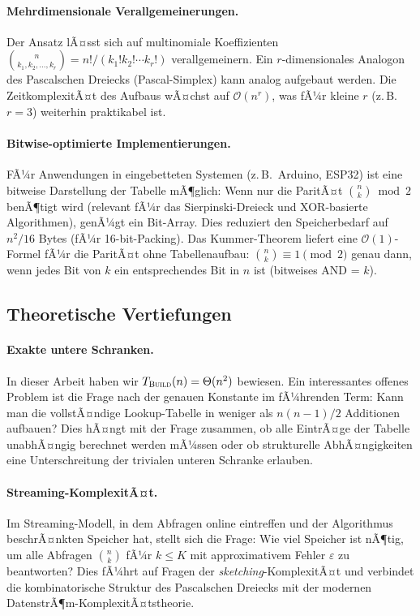 ﻿\documentclass[12pt, a4paper]{article}
\newcommand{\Oh}{\mathcal{O}}
\newcommand{\build}{\textsc{Build}}
\theoremstyle{plain}
\theoremstyle{definition}
\theoremstyle{remark}
\renewcommand{\Oh}{\mathcal{O}}
\renewcommand{\build}{\textsc{Build}}
\begin{document}
\paragraph{Mehrdimensionale Verallgemeinerungen.}
Der Ansatz lÃ¤sst sich auf multinomiale Koeffizienten
$\binom{n}{k_1, k_2, \ldots, k_r} = n! / (k_1! k_2! \cdots k_r!)$
verallgemeinern. Ein $r$-dimensionales Analogon des Pascalschen
Dreiecks (Pascal-Simplex) kann analog aufgebaut werden. Die
ZeitkomplexitÃ¤t des Aufbaus wÃ¤chst auf $\Oh(n^r)$, was fÃ¼r kleine
$r$ (z.\,B.\ $r = 3$) weiterhin praktikabel ist.

\paragraph{Bitwise-optimierte Implementierungen.}
FÃ¼r Anwendungen in eingebetteten Systemen (z.\,B.\ Arduino, ESP32)
ist eine bitweise Darstellung der Tabelle mÃ¶glich: Wenn nur die
ParitÃ¤t $\binom{n}{k} \bmod 2$ benÃ¶tigt wird (relevant fÃ¼r das
Sierpinski-Dreieck und XOR-basierte Algorithmen), genÃ¼gt ein
Bit-Array. Dies reduziert den Speicherbedarf auf $n^2/16$ Bytes
(fÃ¼r 16-bit-Packing). Das Kummer-Theorem liefert eine
$\Oh(1)$-Formel fÃ¼r die ParitÃ¤t ohne Tabellenaufbau:
$\binom{n}{k} \equiv 1 \pmod{2}$ genau dann, wenn jedes Bit von $k$
ein entsprechendes Bit in $n$ ist (bitweises AND = $k$).

\subsection{Theoretische Vertiefungen}

\paragraph{Exakte untere Schranken.}
In dieser Arbeit haben wir $T_{\build}(n) = \Theta(n^2)$ bewiesen.
Ein interessantes offenes Problem ist die Frage nach der genauen
Konstante im fÃ¼hrenden Term: Kann man die vollstÃ¤ndige Lookup-Tabelle
in weniger als $n(n-1)/2$ Additionen aufbauen? Dies hÃ¤ngt mit der
Frage zusammen, ob alle EintrÃ¤ge der Tabelle unabhÃ¤ngig berechnet
werden mÃ¼ssen oder ob strukturelle AbhÃ¤ngigkeiten eine Unterschreitung
der trivialen unteren Schranke erlauben.

\paragraph{Streaming-KomplexitÃ¤t.}
Im Streaming-Modell, in dem Abfragen online eintreffen und der
Algorithmus beschrÃ¤nkten Speicher hat, stellt sich die Frage:
Wie viel Speicher ist nÃ¶tig, um alle Abfragen $\binom{n}{k}$ fÃ¼r
$k \le K$ mit approximativem Fehler $\varepsilon$ zu beantworten?
Dies fÃ¼hrt auf Fragen der \emph{sketching}-KomplexitÃ¤t und
verbindet die kombinatorische Struktur des Pascalschen Dreiecks
mit der modernen DatenstrÃ¶m-KomplexitÃ¤tstheorie.
\end{document}
